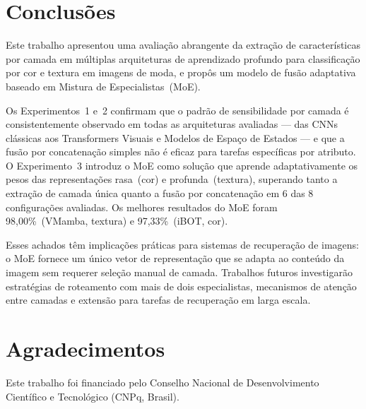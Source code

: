 \documentclass[conference]{IEEEtran}
\begin{document}
\section{Conclusões}

Este trabalho apresentou uma avaliação abrangente da extração de
características por camada em múltiplas arquiteturas de aprendizado
profundo para classificação por cor e textura em imagens de moda, e
propôs um modelo de fusão adaptativa baseado em Mistura de
Especialistas~(MoE).

Os Experimentos~1 e~2 confirmam que o padrão de sensibilidade por camada
é consistentemente observado em todas as arquiteturas avaliadas — das
CNNs clássicas aos Transformers Visuais e Modelos de Espaço de Estados —
e que a fusão por concatenação simples não é eficaz para tarefas
específicas por atributo.
O Experimento~3 introduz o MoE como solução que aprende adaptativamente
os pesos das representações rasa~(cor) e profunda~(textura), superando
tanto a extração de camada única quanto a fusão por concatenação em 6 das
8 configurações avaliadas.
Os melhores resultados do MoE foram 98,00\%~(VMamba, textura) e
97,33\%~(iBOT, cor).

Esses achados têm implicações práticas para sistemas de recuperação de
imagens: o MoE fornece um único vetor de representação que se adapta ao
conteúdo da imagem sem requerer seleção manual de camada.
Trabalhos futuros investigarão estratégias de roteamento com mais de dois
especialistas, mecanismos de atenção entre camadas e extensão para tarefas
de recuperação em larga escala.

\section*{Agradecimentos}

Este trabalho foi financiado pelo Conselho Nacional de Desenvolvimento
Científico e Tecnológico (CNPq, Brasil).
\end{document}
